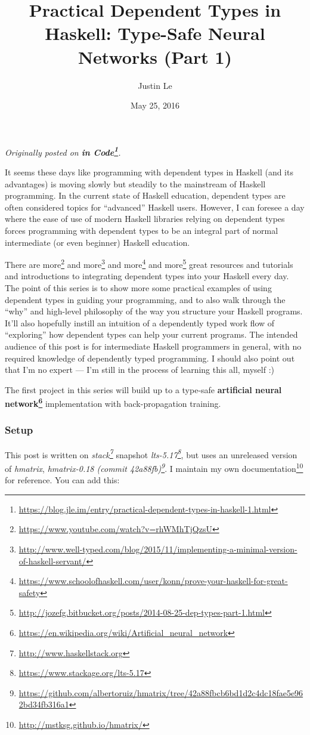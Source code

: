 \documentclass[]{article}
\title{Practical Dependent Types in Haskell: Type-Safe Neural Networks (Part 1)}
\author{Justin Le}
\date{May 25, 2016}
\renewcommand{\href}[2]{#2\footnote{\url{#1}}}
\begin{document}
\maketitle

\emph{Originally posted on
\textbf{\href{https://blog.jle.im/entry/practical-dependent-types-in-haskell-1.html}{in
Code}}.}

It seems these days like programming with dependent types in Haskell (and its
advantages) is moving slowly but steadily to the mainstream of Haskell
programming. In the current state of Haskell education, dependent types are
often considered topics for ``advanced'' Haskell users. However, I can foresee a
day where the ease of use of modern Haskell libraries relying on dependent types
forces programming with dependent types to be an integral part of normal
intermediate (or even beginner) Haskell education.

There are \href{https://www.youtube.com/watch?v=rhWMhTjQzsU}{more} and
\href{http://www.well-typed.com/blog/2015/11/implementing-a-minimal-version-of-haskell-servant/}{more}
and
\href{https://www.schoolofhaskell.com/user/konn/prove-your-haskell-for-great-safety}{more}
and
\href{http://jozefg.bitbucket.org/posts/2014-08-25-dep-types-part-1.html}{more}
great resources and tutorials and introductions to integrating dependent types
into your Haskell every day. The point of this series is to show more some
practical examples of using dependent types in guiding your programming, and to
also walk through the ``why'' and high-level philosophy of the way you structure
your Haskell programs. It'll also hopefully instill an intuition of a
dependently typed work flow of ``exploring'' how dependent types can help your
current programs. The intended audience of this post is for intermediate Haskell
programmers in general, with no required knowledge of dependently typed
programming. I should also point out that I'm no expert --- I'm still in the
process of learning this all, myself :)

The first project in this series will build up to a type-safe
\textbf{\href{https://en.wikipedia.org/wiki/Artificial_neural_network}{artificial
neural network}} implementation with back-propagation training.

\subsubsection{Setup}\label{setup}

This post is written on \emph{\href{http://www.haskellstack.org}{stack}}
snapshot \emph{\href{https://www.stackage.org/lts-5.17}{lts-5.17}}, but uses an
unreleased version of \emph{hmatrix},
\emph{\href{https://github.com/albertoruiz/hmatrix/tree/42a88fbcb6bd1d2c4dc18fae5e962bd34fb316a1}{hmatrix-0.18
(commit 42a88fb)}}. I \href{http://mstksg.github.io/hmatrix/}{maintain my own
documentation} for reference. You can add this:
\end{document}
